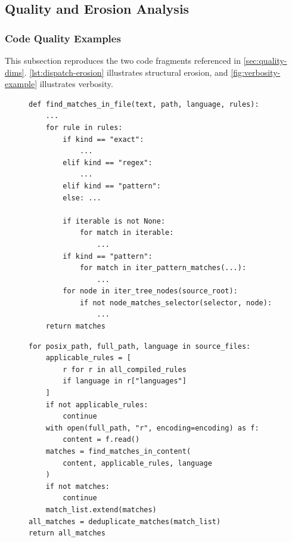 \subsection{Quality and Erosion Analysis}\label{sec:appendix-quality}

\subsubsection{Code Quality Examples}\label{sec:appendix-quality-examples}

This subsection reproduces the two \codesearch{} code fragments referenced in \autoref{sec:quality-dims}. \autoref{lst:dispatch-erosion} illustrates structural erosion, and \autoref{fig:verbosity-example} illustrates verbosity.

\begin{figure}[h]
\begin{lstlisting}[caption={Structurally eroded \texttt{find\_matches\_in\_file()} in \codesearch{} at $\ckpt{5}$ (117 lines total). Nearly all decision-point mass ends up in one function.},label={lst:dispatch-erosion}]
def find_matches_in_file(text, path, language, rules):
    ...
    for rule in rules:
        if kind == "exact":
            ...
        elif kind == "regex":
            ...
        elif kind == "pattern":
        else: ...

        if iterable is not None:
            for match in iterable:
                ...
        if kind == "pattern":
            for match in iter_pattern_matches(...):
                ...
        for node in iter_tree_nodes(source_root):
            if not node_matches_selector(selector, node):
                ...
    return matches
\end{lstlisting}
\end{figure}

\begin{figure}[h]
\begin{lstlisting}[caption={Overly verbose code from \codesearch{}. Identity list comprehension instead of \texttt{filter}, empty checks instead of building around iteration, and single-use variables.},label={fig:verbosity-example}]
for posix_path, full_path, language in source_files:
    applicable_rules = [
        r for r in all_compiled_rules
        if language in r["languages"]
    ]
    if not applicable_rules:
        continue
    with open(full_path, "r", encoding=encoding) as f:
        content = f.read()
    matches = find_matches_in_content(
        content, applicable_rules, language
    )
    if not matches:
        continue
    match_list.extend(matches)
all_matches = deduplicate_matches(match_list)
return all_matches
\end{lstlisting}
\end{figure}

